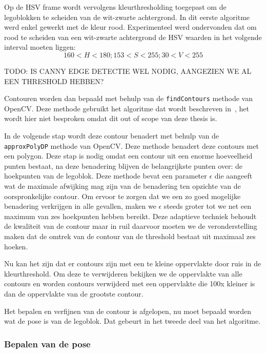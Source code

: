 Op de HSV frame wordt vervolgens kleurthresholding toegepast om de legoblokken te scheiden van de wit-zwarte achtergrond. In dit eerste algoritme werd enkel gewerkt met de kleur rood. Experimenteel werd ondervonden dat om rood te scheiden van een wit-zwarte achtergrond de HSV waarden in het volgende interval moeten liggen:
$$ 160 < H < 180; 153 < S < 255; 30 < V < 255$$

TODO: IS CANNY EDGE DETECTIE WEL NODIG, AANGEZIEN WE AL EEN THRESHOLD HEBBEN? %

Contouren worden dan bepaald met behulp van de \texttt{findContours} methode van OpenCV. Deze methode gebruikt het algoritme dat wordt beschreven in~\cite{suzuki1985topological}, het wordt hier niet besproken omdat dit out of scope van deze thesis is.

In de volgende stap wordt deze contour benadert met behulp van de \texttt{approxPolyDP} methode van OpenCV. Deze methode benadert deze contours met een polygon. Deze stap is nodig omdat een contour uit een enorme hoeveelheid punten bestaat, na deze benadering blijven de belangrijkste punten over: de hoekpunten van de legoblok. Deze methode bevat een parameter $\epsilon$ die aangeeft wat de maximale afwijking mag zijn van de benadering ten opzichte van de oorspronkelijke contour. Om ervoor te zorgen dat we een zo goed mogelijke benadering verkrijgen in alle gevallen, maken we $\epsilon$ steeds groter tot we net een maximum van zes hoekpunten hebben bereikt. Deze adaptieve techniek behoudt de kwaliteit van de contour maar in ruil daarvoor moeten we de veronderstelling maken dat de omtrek van de contour van de threshold bestaat uit maximaal zes hoeken.

Nu kan het zijn dat er contours zijn met een te kleine oppervlakte door ruis in de kleurthreshold. Om deze te verwijderen bekijken we de oppervlakte van alle contours en worden contours verwijderd met een oppervlakte die 100x kleiner is dan de oppervlakte van de grootste contour.

Het bepalen en verfijnen van de contour is afgelopen, nu moet bepaald worden wat de pose is van de legoblok. Dat gebeurt in het tweede deel van het algoritme.

\subsubsection*{Bepalen van de pose}


